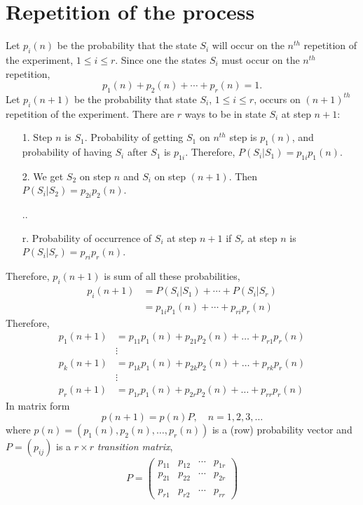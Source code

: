 \section{Repetition of the process}

Let $p_i(n)$ be the probability that the state $S_i$ will occur on the $n^{th}$ repetition of the experiment, $1\leq i\leq r$. 
Since one the states $S_i$ must occur on the $n^{th}$ repetition,
\[
p_1(n)+p_2(n)+\cdots+p_r(n)=1.
\]
Let $p_i(n+1)$ be the probability that state $S_i$, $1\leq i\leq r$, occurs on $(n+1)^{th}$ repetition of the experiment. 
There are $r$ ways to be in state $S_i$ at step $n+1$:
\begin{enumerate}
\item[1.] Step $n$ is $S_1$. Probability of getting $S_1$ on $n^{th}$ step is $p_1(n)$, and probability of having $S_i$ after $S_1$ is $p_{1i}$. Therefore, $P(S_i|S_1)=p_{1i}p_1(n)$. 
\item[2.] We get $S_2$ on step $n$ and $S_i$ on step $(n+1)$. Then $P(S_i|S_2)=p_{2i}p_2(n)$. 
\item[..]
\item[r.] Probability of occurrence of $S_i$ at step $n+1$ if $S_r$ at step $n$ is $P(S_i|S_r)=p_{ri}p_r(n)$.
\end{enumerate}
Therefore, $p_i(n+1)$ is sum of all these probabilities,
\begin{align*}
p_i(n+1) &= P(S_i|S_1)+\cdots+P(S_i|S_r) \\
&= p_{1i}p_1(n)+\cdots+p_{ri}p_r(n)
\end{align*}
Therefore,
\begin{equation}\label{eq:chain1}
\begin{aligned}
p_1(n+1) &= p_{11}p_1(n)+p_{21}p_2(n)+\dots+p_{r1}p_r(n) \\
& \vdots\\
p_k(n+1) &= p_{1k}p_1(n)+p_{2k}p_2(n)+\dots+p_{rk}p_r(n) \\
& \vdots\\
p_r(n+1) &= p_{1r}p_1(n)+p_{2r}p_2(n)+\dots+p_{rr}p_r(n)
\end{aligned}
\end{equation}
In matrix form
\begin{equation}
p(n+1)=p(n)P, \quad n=1,2,3,\dots
\end{equation}
where $p(n)=(p_1(n),p_{2}(n),\dots , p_r(n))$ is a (row) probability vector and $P=(p_{ij})$ is a $r\times r$ \emph{transition matrix},
\[
P=
\begin{pmatrix}
p_{11} & p_{12} & \cdots & p_{1r} \\
p_{21} & p_{22} & \cdots & p_{2r} \\
&&& \\
p_{r1} & p_{r2} & \cdots & p_{rr}
\end{pmatrix}
\]
